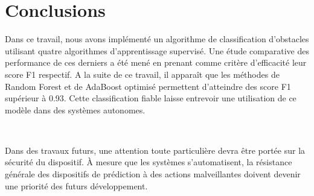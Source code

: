 \documentclass[a4paper]{report}
\begin{document}
\chapter{Conclusions}

Dans ce travail, nous avons implémenté un algorithme de classification d’obstacles utilisant quatre algorithmes d’apprentissage supervisé. Une étude comparative des performance de ces derniers a été mené en prenant comme critère d’efficacité leur score F1 respectif. A la suite de ce travail, il apparaît que les méthodes de Random Forest et de AdaBoost optimisé permettent d’atteindre des score F1 supérieur à 0.93. Cette classification fiable laisse entrevoir une utilisation de ce modèle dans des systèmes autonomes.

~\par

Dans des travaux futurs, une attention toute particulière devra être portée sur la sécurité du dispositif. À mesure que les systèmes s’automatisent, la rési\-stance générale des dispositifs de prédiction à des actions malveillantes doivent devenir une priorité des futurs développement. 





\listoffigures
\begingroup
\let\clearpage\relax
\listoftables
\endgroup
\end{document}
